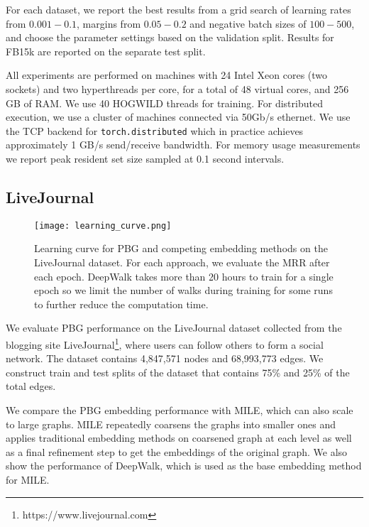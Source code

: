 \documentclass{article}
\begin{document}
For each dataset, we report the best results from a grid search of learning rates from $0.001-0.1$, margins from $0.05-0.2$ and negative batch sizes of $100-500$, and choose the parameter settings based on the validation split. Results for FB15k are reported on the separate test split. 

All experiments are performed on machines with 24 Intel\textsuperscript{\textregistered} Xeon\textsuperscript{\textregistered} cores (two sockets) and two hyperthreads per core, for a total of 48 virtual cores, and 256 GB of RAM. We use 40 HOGWILD threads for training. For distributed execution, we use a cluster of machines connected via 50Gb/s ethernet. We use the TCP backend for \texttt{torch.distributed} which in practice achieves approximately 1 GB/s send/receive bandwidth. For memory usage measurements we report peak resident set size sampled at 0.1 second intervals.









\subsection{LiveJournal}

\begin{figure}[t]
\texttt{[image: learning\_curve.png]}
\vspace{-6mm}
\caption{Learning curve for PBG and competing embedding methods on the LiveJournal dataset. For each approach, we evaluate the MRR after each epoch. DeepWalk takes more than 20 hours to train for a single epoch so we limit the number of walks during training for some runs to further reduce the computation time.}
\vspace{-3mm}
\label{fig:learning_curve_livejournal}
\end{figure}

We evaluate PBG performance on the LiveJournal dataset \cite{backstrom2006group,leskovec2009community} collected from the blogging site LiveJournal\footnote{https://www.livejournal.com}, where users can follow others to form a social network. The dataset contains 4,847,571 nodes and 68,993,773 edges. We construct train and test splits of the dataset that contains 75\% and 25\% of the total edges. 

We compare the PBG embedding performance with MILE, which can also scale to large graphs. MILE repeatedly coarsens the graphs into smaller ones and applies traditional embedding methods on coarsened graph at each level as well as a final refinement step to get the embeddings of the original graph. We also show the performance of DeepWalk, which is used as the base embedding method for MILE.
\end{document}
